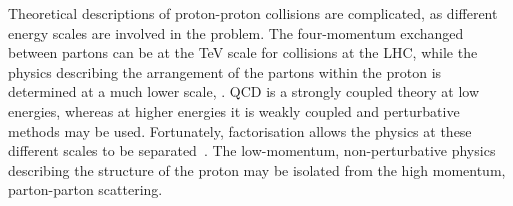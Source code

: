 %
%
%




%
%
 
 
Theoretical descriptions of proton-proton collisions are complicated, as different energy scales are involved in the problem. The four-momentum exchanged between partons can be at the TeV scale for collisions at the LHC, while the physics describing the arrangement of the partons within the proton is determined at a much lower scale, \lqcd. QCD is a strongly coupled theory at low energies, whereas at higher energies it is weakly coupled and perturbative methods may be used. Fortunately, factorisation  allows the physics at these different scales to be separated~\cite{Collins1985104}. The low-momentum, non-perturbative physics describing the structure of the proton may be isolated from the high momentum, parton-parton scattering. 
 
